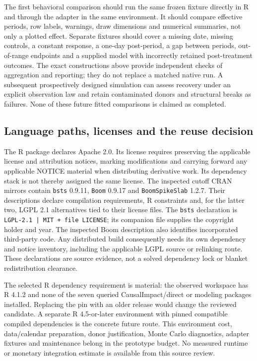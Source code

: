 The first behavioral comparison should run the same frozen fixture directly
in R and through the adapter in the same environment. It should compare
effective periods, row labels, warnings, draw dimensions and numerical
summaries, not only a plotted effect. Separate fixtures should cover a missing
date, missing controls, a constant response, a one-day post-period, a gap
between periods, out-of-range endpoints and a supplied model with incorrectly
retained post-treatment outcomes. The exact constructions above provide
independent checks of aggregation and reporting; they do not replace a
matched native run. A subsequent prospectively designed simulation can
assess recovery under an explicit observation law and retain contaminated
donors and structural breaks as failures. None of these future fitted
comparisons is claimed as completed. \citep{exec13_ci_reuse}

\subsection{Language paths, licenses and the reuse decision}

The R package declares Apache 2.0. Its license requires preserving the
applicable license and attribution notices, marking modifications and
carrying forward any applicable NOTICE material when distributing derivative
work. Its dependency stack is not thereby assigned the same license. The
inspected cutoff CRAN mirrors contain \texttt{bsts} 0.9.11,
\texttt{Boom} 0.9.17 and \texttt{BoomSpikeSlab} 1.2.7. Their descriptions
declare compilation requirements, R constraints and, for the latter two,
LGPL 2.1 alternatives tied to their license files. The \texttt{bsts}
declaration is \texttt{LGPL-2.1 | MIT + file LICENSE}; its companion file
supplies the copyright holder and year. The inspected Boom description also
identifies incorporated third-party code. Any distributed build consequently
needs its own dependency and notice inventory, including the applicable
LGPL source or relinking route. These declarations are source evidence, not
a solved dependency lock or blanket redistribution clearance.
\citep{exec13_ci_r,exec13_ci_dependencies}

The selected R dependency requirement is material: the observed workspace
has R 4.1.2 and none of the seven queried CausalImpact/direct or modeling
packages installed. Replacing the pin with an older release would change
the reviewed candidate. A separate R 4.5-or-later environment with pinned
compatible compiled dependencies is the concrete future route. This
environment cost, data/calendar preparation, donor justification, Monte
Carlo diagnostics, adapter fixtures and maintenance belong in the prototype
budget. No measured runtime or monetary integration estimate is available
from this source review. \citep{exec13_ci_reuse,exec13_ci_dependencies}

